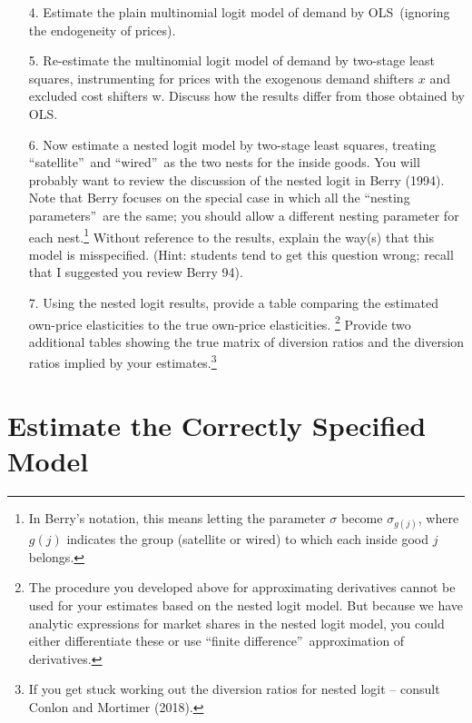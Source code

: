 \documentclass[english,11pt]{article}
\begin{document}
\begin{enumerate}
\item[4.] Estimate the plain multinomial logit model of demand by OLS\
(ignoring the endogeneity of prices).

\item[5.] Re-estimate the multinomial logit model of demand by two-stage
least squares, instrumenting for prices with the exogenous demand shifters $%
x $ and excluded cost shifters w. Discuss how the results differ from those
obtained by OLS.

\item[6.] Now estimate a nested logit model by two-stage least squares,
treating \textquotedblleft satellite\textquotedblright\ and
\textquotedblleft wired\textquotedblright\ as the two nests for the inside
goods. You will probably want to review the discussion of the nested logit
in Berry (1994). Note that Berry focuses on the special case in which all
the \textquotedblleft nesting parameters\textquotedblright\ are the same;
you should allow a different nesting parameter for each nest.\footnote{%
In Berry's notation, this means letting the parameter $\sigma $ become $%
\sigma _{g(j)}$, where $g\left( j\right) $ indicates the group (satellite or
wired) to which each inside good $j$ belongs.} Without reference to the
results, explain the way(s) that this model is misspecified. (Hint: students
tend to get this question wrong; recall that I suggested you review Berry
94).

\item[7.] Using the nested logit results, provide a table comparing the
estimated own-price elasticities to the true own-price elasticities.%
\footnote{%
The procedure you developed above for approximating derivatives cannot be
used for your estimates based on the nested logit model. But because we have
analytic expressions for market shares in the nested logit model, you could
either differentiate these or use \textquotedblleft finite
difference\textquotedblright\ approximation of derivatives.} Provide two
additional tables showing the true matrix of diversion ratios and the
diversion ratios implied by your estimates.\footnote{If you get stuck working out the diversion ratios for nested logit -- consult Conlon and Mortimer (2018).}
\end{enumerate}

\section{Estimate the Correctly Specified Model}
\end{document}
